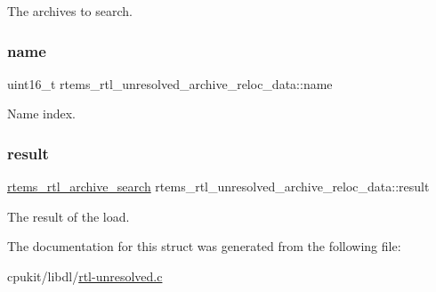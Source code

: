 The archives to search. \mbox{\label{structrtems__rtl__unresolved__archive__reloc__data_a94655fce8a4e891b438782562e122377}} 
\subsubsection{\texorpdfstring{name}{name}}
{\footnotesize\ttfamily uint16\+\_\+t rtems\+\_\+rtl\+\_\+unresolved\+\_\+archive\+\_\+reloc\+\_\+data\+::name}

Name index. \mbox{\label{structrtems__rtl__unresolved__archive__reloc__data_a38c4f3523e8a4e33c215497f8f5420ed}} 
\subsubsection{\texorpdfstring{result}{result}}
{\footnotesize\ttfamily \mbox{\hyperlink{rtl-archive_8h_a82930c14e64f3f5853052e84af4a6c2e}{rtems\+\_\+rtl\+\_\+archive\+\_\+search}} rtems\+\_\+rtl\+\_\+unresolved\+\_\+archive\+\_\+reloc\+\_\+data\+::result}

The result of the load. 

The documentation for this struct was generated from the following file\+:\begin{DoxyCompactItemize}
\item 
cpukit/libdl/\mbox{\hyperlink{rtl-unresolved_8c}{rtl-\/unresolved.\+c}}\end{DoxyCompactItemize}
